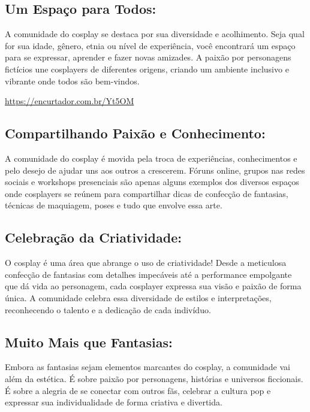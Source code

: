 \documentclass[12pt,a4paper,chapter=TITLE,section=TITLE,subsection=TITLE,subsubsection=TITLE]{article}
\begin{document}
\subsection{Um Espaço para Todos:}

A comunidade do cosplay se destaca por sua diversidade e acolhimento. Seja qual for sua idade, gênero, etnia ou nível de experiência, você encontrará um espaço para se expressar, aprender e fazer novas amizades. A paixão por personagens fictícios une cosplayers de diferentes origens, criando um ambiente inclusivo e vibrante onde todos são bem-vindos.


\url{https://encurtador.com.br/Yt5OM}

\subsection{Compartilhando Paixão e Conhecimento:}

A comunidade do cosplay é movida pela troca de experiências, conhecimentos e pelo desejo de ajudar uns aos outros a crescerem. Fóruns online, grupos nas redes sociais e workshops presenciais são apenas alguns exemplos dos diversos espaços onde cosplayers se reúnem para compartilhar dicas de confecção de fantasias, técnicas de maquiagem, poses e tudo que envolve essa arte.


\subsection{Celebração da Criatividade:}

O cosplay é uma área que abrange o uso de criatividade! Desde a meticulosa confecção de fantasias com detalhes impecáveis até a performance empolgante que dá vida ao personagem, cada cosplayer expressa sua visão e paixão de forma única. A comunidade celebra essa diversidade de estilos e interpretações, reconhecendo o talento e a dedicação de cada indivíduo.



\subsection{Muito Mais que Fantasias:}

Embora as fantasias sejam elementos marcantes do cosplay, a comunidade vai além da estética. É sobre paixão por personagens, histórias e universos ficcionais. É sobre a alegria de se conectar com outros fãs, celebrar a cultura pop e expressar sua individualidade de forma criativa e divertida.
\end{document}

